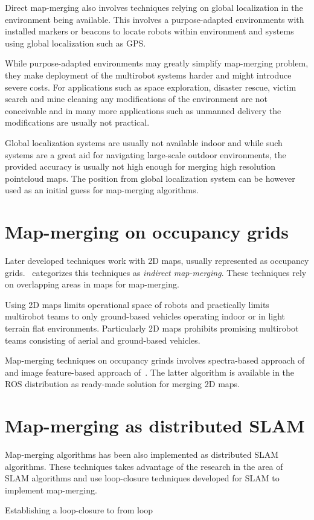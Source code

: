 Direct map-merging also involves techniques relying on global localization in the environment being available. This involves a purpose-adapted environments with installed markers or beacons to locate robots within environment and systems using global localization such as \gls{GPS}.

While purpose-adapted environments may greatly simplify map-merging problem, they make deployment of the multirobot systems harder and might introduce severe costs. For applications such as space exploration, disaster rescue, victim search and mine cleaning any modifications of the environment are not conceivable and in many more applications such as unmanned delivery the modifications are usually not practical.

Global localization systems are usually not available indoor and while such systems are a great aid for navigating large-scale outdoor environments, the provided accuracy is usually not high enough for merging high resolution pointcloud maps. The position from global localization system can be however used as an initial guess for map-merging algorithms.

\section{Map-merging on occupancy grids}

Later developed techniques work with 2D maps, usually represented as occupancy grids. \cite{lee2012survey}~categorizes this techniques as \textit{indirect map-merging}. These techniques rely on overlapping areas in maps for map-merging.

Using 2D maps limits operational space of robots and practically limits multirobot teams to only ground-based vehicles operating indoor or in light terrain flat environments. Particularly 2D maps prohibits promising multirobot teams consisting of aerial and ground-based vehicles.

Map-merging techniques on occupancy grinds involves spectra-based approach of~\cite{carpin2008spectra} and image feature-based approach of~\cite{Horner2016}. The latter algorithm is available in the \gls{ROS} distribution as ready-made solution for merging 2D maps.

\section{Map-merging as distributed SLAM}

Map-merging algorithms has been also implemented as distributed \gls{SLAM} algorithms. These techniques takes advantage of the research in the area of \gls{SLAM} algorithms and use loop-closure techniques developed for \gls{SLAM} to implement map-merging.

Establishing a loop-closure to from loop
